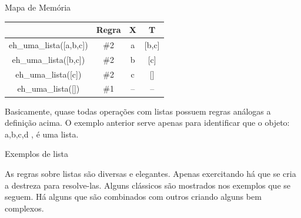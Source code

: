 \documentclass[sans]{beamer}
\begin{document}

\begin{frame}

\begin{block} {Mapa de Memória}

\begin{center}{
\begin{tabular}
[c]{c|c|c|c}\hline \hline
& \textbf{Regra} & \textbf{X} & \textbf{T}\\ \hline \hline
eh\_uma\_lista([a,b,c]) & \#2 & a & [b,c]\\ \hline
eh\_uma\_lista([b,c]) & \#2 & b & [c]\\ \hline
eh\_uma\_lista([c]) & \#2 & c & []\\ \hline
eh\_uma\_lista([]) & \#1 & -- & --\\ \hline \hline
\end{tabular}}
\end{center}

  Basicamente, quase todas operações com listas possuem regras análogas a definição acima. 
 O exemplo anterior serve apenas para identificar que o  objeto: \lbrack a,b,c,d \rbrack ,  é uma lista.

\end{block}   
\end{frame}


\begin{frame}
\begin{block}{Exemplos de lista}

  As regras sobre listas são diversas e elegantes. Apenas exercitando
há que se cria a destreza para resolve-las.
Alguns  clássicos são mostrados nos exemplos que se seguem. Há alguns
que são combinados com outros criando alguns bem complexos.

\end{block}
\end{frame}

\end{document}
